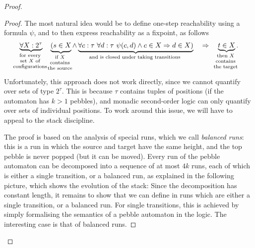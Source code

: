 \begin{proof}
    \begin{proof}
        The most natural idea would be to define one-step reachability using a formula $\psi$, and to then express  reachability as a fixpoint, as follows
        \begin{align*}
        \myunderbrace{\forall X : 2^\tau}{for every \\ set $X$ of \\ configurations} 
        \quad 
        \myunderbrace{(s \in X}{if $X$ \\ contains\\ the source} \land \myunderbrace{\forall c : \tau \ \forall d : \tau\  \psi(c,d) \land c \in X \Rightarrow d \in X)}{and is closed under  taking transitions} \quad \Rightarrow \quad \myunderbrace{t \in X}{then  $X$ \\ contains\\ the target}.
        \end{align*}
        Unfortunately, this approach does not work directly, since we cannot quantify over sets of type $2^\tau$. This is because $\tau$ contains tuples of positions (if the automaton has $k>1$ pebbles), and monadic second-order logic can only quantify over sets of individual positions. To work around this issue, we will have to appeal to the stack discipline. 
        
        The proof is based on the analysis of special runs, which we call \emph{balanced runs}: this is a run in which the source and target have the same height, and the top pebble is never popped (but it can be moved).  Every run of the pebble automaton can be decomposed into a sequence of at most $4k$ runs, each of which is either a single transition, or a balanced run, as explained in the following picture, which shows the evolution of the stack:
    Since the decomposition has constant length, it remains to show that we can define in \mso runs which are either a single transition, or a balanced run. For single transitions, this is achieved by simply formalising the semantics of a pebble automaton in the logic. The interesting case is that of balanced runs. 


\end{proof}
\end{proof}
